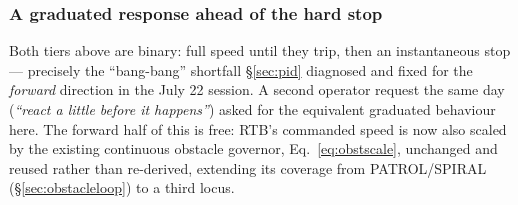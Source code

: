 \subsubsection{A graduated response ahead of the hard stop}
\label{sec:july24rtbgrad}
Both tiers above are binary: full speed until they trip, then an
instantaneous stop — precisely the ``bang-bang'' shortfall
\S\ref{sec:pid} diagnosed and fixed for the \emph{forward} direction in the
July 22 session. A second operator request the same day
(\emph{``react a little before it happens''}) asked for the equivalent
graduated behaviour here. The forward half of this is free: RTB's commanded
speed is now also scaled by the existing continuous obstacle governor,
Eq.~\ref{eq:obstscale}, unchanged and reused rather than re-derived,
extending its coverage from PATROL/SPIRAL (\S\ref{sec:obstacleloop}) to a
third locus.

